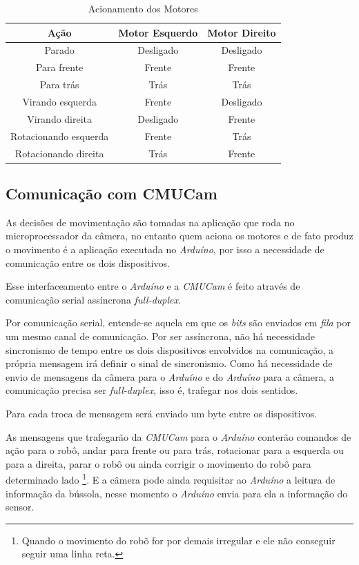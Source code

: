 \begin{table}[h!]
    \centering
    \begin{tabular}{|c|c|c|} \hline
        \textbf{Ação} & \textbf{Motor Esquerdo} & \textbf{Motor Direito} \\ \hline
        Parado & Desligado & Desligado \\ \hline
        Para frente & Frente & Frente \\ \hline
        Para trás & Trás & Trás \\ \hline
        Virando esquerda & Frente & Desligado \\ \hline
        Virando direita & Desligado & Frente \\ \hline
        Rotacionando esquerda & Frente & Trás \\ \hline
        Rotacionando direita & Trás & Frente \\ \hline
    \end{tabular}
    \caption{Acionamento dos Motores}
    \label{int_tbl03}
\end{table}

\subsection{Comunicação com CMUCam}

As decisões de movimentação são tomadas na aplicação que roda no microprocessador da câmera, no entanto quem aciona os motores e de fato produz o movimento é a aplicação executada no \textit{Arduíno}, por isso a necessidade de comunicação entre os dois dispositivos.

Esse interfaceamento entre o \textit{Arduíno} e a \textit{CMUCam} é feito através de comunicação serial assíncrona \textit{full-duplex}.

Por comunicação serial, entende-se aquela em que os \textit{bits} são enviados em \textit{fila} por um mesmo canal de comunicação. Por ser assíncrona, não há necessidade sincronismo de tempo entre os dois dispositivos envolvidos na comunicação, a própria mensagem irá definir o sinal de sincronismo. Como há necessidade de envio de mensagens da câmera para o \textit{Arduíno} e do \textit{Arduíno} para a câmera, a comunicação precisa ser \textit{full-duplex}, isso é, trafegar nos dois sentidos.

Para cada troca de mensagem será enviado um byte entre os dispositivos.

As mensagens que trafegarão da \textit{CMUCam} para o \textit{Arduíno} conterão comandos de ação para o robô, andar para frente ou para trás, rotacionar para a esquerda ou para a direita, parar o robô ou ainda corrigir o movimento do robô para determinado lado \footnote{Quando o movimento do robõ for por demais irregular e ele não conseguir seguir uma linha reta.}. E a câmera pode ainda requisitar ao \textit{Arduíno} a leitura de informação da bússola, nesse momento o \textit{Arduíno} envia para ela a informação do sensor.

